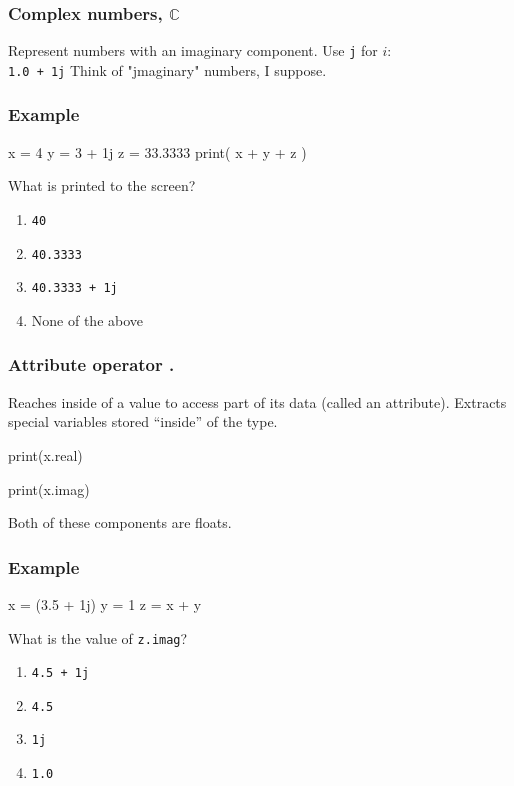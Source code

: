 \documentclass[11pt]{beamer}
\begin{document}
\begin{frame}
  \frametitle{Complex numbers, $\mathbb{C}$}
  \Enlarge

  \begin{itemize}
  \myitem  Represent numbers with an imaginary component. \pause
  \myitem  Use \texttt{j} for $i$: \\
    \textcolor{CS101GradBot}{\texttt{1.0 + 1j}} \pause
  \myitem  Think of "jmaginary" numbers, I suppose.
  \end{itemize}
\end{frame}

\begin{frame}[fragile]
  \frametitle{Example}
  \Enlarge

  \begin{semiverbatim}
x = 4
y = 3 + 1j
z = 33.3333
print( x + y + z )
  \end{semiverbatim}
  What is printed to the screen? \pause
  \begin{enumerate}[label=\Alph*]
  \item  \texttt{40}
  \item  \texttt{40.3333}
  \item  \texttt{40.3333 + 1j}
  \item  None of the above
  \end{enumerate}
\end{frame}

\begin{frame}
  \frametitle{Attribute operator \textbf{.}}
  \Enlarge

  \begin{itemize}
  \myitem  Reaches inside of a value to access part of its data (called an attribute). \pause
  \myitem  Extracts special variables stored ``inside'' of the type.
    \begin{semiverbatim}
print(x.real)

print(x.imag)
    \end{semiverbatim} \pause
  \myitem  Both of these components are floats.
  \end{itemize}
\end{frame}

\begin{frame}[fragile]
  \frametitle{Example}
  \Enlarge

  \begin{semiverbatim}
x = (3.5 + 1j)
y = 1
z = x + y
  \end{semiverbatim}
  What is the value of \texttt{z.imag}? \pause
  \begin{enumerate}[label=\Alph*]
  \item  \texttt{4.5 + 1j}
  \item  \texttt{4.5}
  \item  \texttt{1j}
  \item  \texttt{1.0}
  \end{enumerate}
\end{frame}
\end{document}
